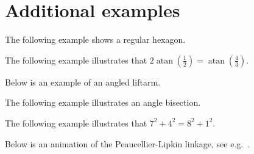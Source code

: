 \documentclass[a4paper,english,dvipsnames]{ltxdoc}
\DeclareMathOperator{\atan}{atan}
\begin{document}
\section{Additional examples}
The following example shows a regular hexagon.
\begin{codeexample}[width=9cm]
\end{codeexample}
The following example illustrates that $2\atan(\frac{1}{2})=\atan(\frac{4}{3})$.
\begin{codeexample}[width=9cm]
\end{codeexample}
Below is an example of an angled liftarm.
\begin{codeexample}[width=9cm]
\end{codeexample}
The following example illustrates an angle bisection.
\begin{codeexample}[width=9cm]
\end{codeexample}
The following example illustrates that $7^{2}+4^{2}=8^{2}+1^{2}$.
\begin{codeexample}[width=9cm]
\end{codeexample}
Below is an animation of the Peaucellier-Lipkin linkage, see e.g.~\cite{Koagmopermbl}.
\end{document}
